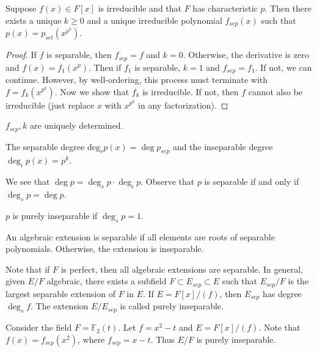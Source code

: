 \documentclass[10pt, twoside]{article}
\newcommand{\F}{\mathbb{F}}
\begin{document}
    \begin{prop}
        Suppose $f(x) \in F[x]$ is irreducible and that $F$ has characteristic $p$. Then there exists a unique $k \geq 0$ and a unique irreducible polynomial $f_{sep}(x)$ such that $p(x) = p_{set}(x^{p^k})$.

        \begin{proof}
            If $f$ is separable, then $f_{sep} = f$ and $k=0$. Otherwise, the derivative is zero and $f(x) = f_1(x^p)$. Then if $f_1$ is separable, $k=1$ and $f_{sep} = f_1$. If not, we can continue. However, by well-ordering, this process must terminate with $f = f_k(x^{p^k})$. Now we show that $f_k$ is irreducible. If not, then $f$ cannot also be irreducible (just replace $x$ with $x^{p^k}$ in any factorization).
        \end{proof}
    \end{prop}

    \begin{rmk}
        $f_{sep}, k$ are uniquely determined.
    \end{rmk}

    \begin{defn}
        The separable degree $\mathrm{deg}_s p(x) = \deg p_{sep}$ and the inseparable degree $\deg_i p(x) = p^k$. 
    \end{defn}

    We see that $\deg p = \deg_s p \cdot \deg_i p$. Observe that $p$ is separable if and only if $\deg_s p = \deg p$.

    \begin{defn}
        $p$ is purely inseparable if $\deg_s p = 1$.
    \end{defn}

    \begin{defn}
        An algebraic extension is separable if all elements are roots of separable polynomials. Otherwise, the extension is inseparable.
    \end{defn}

    Note that if $F$ is perfect, then all algebraic extensions are separable. In general, given $E/F$ algebraic, there exists a subfield $F \subset E_{sep} \subset E$ such that $E_{sep}/F$ is the largest separable extension of $F$ in $E$. If $E = F[x]/(f)$, then $E_{sep}$ has degree $\deg_s f$. The extension $E/E_{sep}$ is called purely inseparable.

    \begin{exm}
        Consider the field $F = \F_2(t)$. Let $f = x^2-t$ and $E = F[x]/(f)$. Note that $f(x) = f_{sep}(x^2)$, where $f_{sep} = x-t$. Thus $E/F$ is purely inseparable.
    \end{exm}
\end{document}
